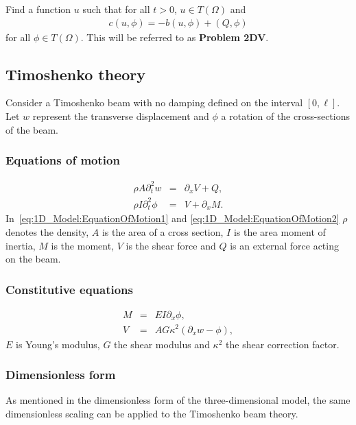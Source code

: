 			Find a function $u$ such that for all $t>0$, $u \in T(\Omega)$ and 
			\begin{align}
				c(u,\phi) = -b(u,\phi) + (Q,\phi) \label{eq:2D_Model:Problem2D1VEq}
			\end{align}
			for all $\phi \in T(\Omega)$. This will be referred to as \textbf{Problem 2DV}.

	\subsection{Timoshenko theory}
		Consider a Timoshenko beam with no damping defined on the interval $[0,\ell]$.
		Let $w$ represent the transverse displacement and $\phi$ a rotation of the cross-sections of the beam.

		\subsubsection*{Equations of motion}\label{sssec:1D_Model:EquationOfMotion}
			\begin{eqnarray}
				\rho A \partial_t^2 w &=& \partial_x V + Q, \label{eq:1D_Model:EquationOfMotion1}\\
				\rho I\partial_t^2 \phi  &=& V + \partial_x M. \label{eq:1D_Model:EquationOfMotion2}
			\end{eqnarray}\label{sym:A}\label{sym:V}\label{sym:Iinertia}\label{sym:M}\label{sym:phiT}
			In~\eqref{eq:1D_Model:EquationOfMotion1} and \eqref{eq:1D_Model:EquationOfMotion2} $\rho$ denotes the density, $A$ is the area of a cross section, $I$ is the area moment of inertia, $M$ is the moment, $V$ is the shear force and $Q$ is an external force acting on the beam.

		\subsubsection*{Constitutive equations}\label{sssec:1D_Model:ConstitutiveEquation}
			\begin{eqnarray}
				M &=& EI\partial_x \phi, \label{eq:1D_Model:ConstitutiveEquations1}\\
				V &=& AG\kappa^2(\partial_x w - \phi), \label{eq:1D_Model:ConstitutiveEquations2}\label{sym:kappa2T}
			\end{eqnarray}
			$E$ is Young's modulus, $G$ the shear modulus and $\kappa^2$ the shear correction factor.

		\subsubsection*{Dimensionless form}\label{sssec:1D_Model:DimensionlessForm}
			As mentioned in the dimensionless form of the three-dimensional model, the same dimensionless scaling can be applied to the Timoshenko beam theory.

